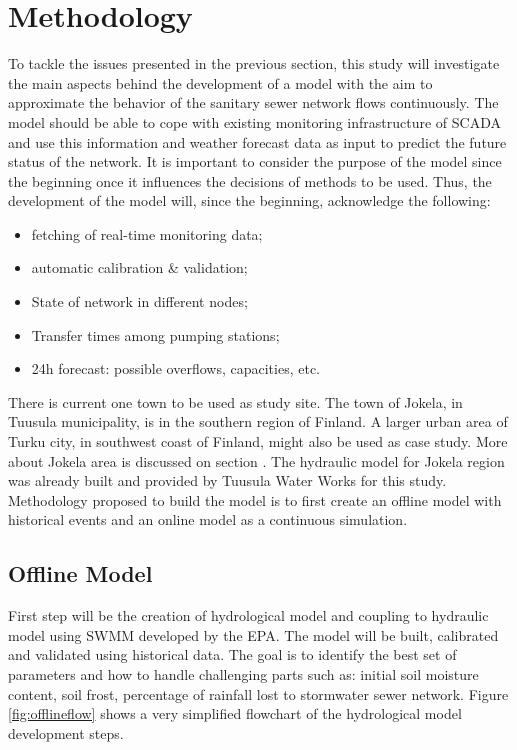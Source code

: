 \chapter{Methodology}

To tackle the issues presented in the previous section, this study will investigate the main aspects behind the development of a model with the aim to approximate the behavior of the sanitary sewer network flows continuously. The model should be able to cope with existing monitoring infrastructure of \acf{SCADA} and use this information and weather forecast data as input to predict the future status of the network. It is important to consider the purpose of the model since the beginning once it influences the decisions of methods to be used. Thus, the development of the model will, since the beginning, acknowledge the following:
\begin{itemize}
    \item fetching of real-time monitoring data;
    \item automatic calibration & validation;
    \item State of network in different nodes;
    \item Transfer times among pumping stations;
    \item 24h forecast: possible overflows, capacities, etc.
\end{itemize}

There is current one town to be used as study site. The town of Jokela, in Tuusula municipality, is in the southern region of Finland. A larger urban area of Turku city, in southwest coast of Finland, might also be used as case study. More about Jokela area is discussed on section . The hydraulic model for Jokela region was already built and provided by Tuusula Water Works for this study. 
Methodology proposed to build the model is to first create an offline model with historical events and an online model as a continuous simulation. 

\section{Offline Model}
First step will be the creation of hydrological model and coupling to hydraulic model using \acf{SWMM} developed by the \acf{EPA}. The model will be built, calibrated and validated using historical data. The goal is to identify the best set of parameters and how to handle challenging parts such as: initial soil moisture content, soil frost, percentage of rainfall lost to stormwater sewer network. Figure \ref{fig:offlineflow} shows a very simplified flowchart of the hydrological model development steps.


